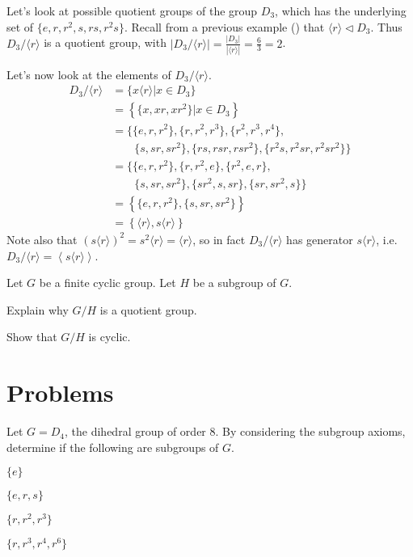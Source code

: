 \begin{example}
    Let's look at possible quotient groups of the group $D_3$, which has the underlying set of $\{e, r, r^2, s, rs, r^2s\}$. Recall from a previous example () that $\langle r \rangle \lhd D_3$. Thus $D_3 / \langle r \rangle$ is a quotient group, with $|D_3 / \langle r \rangle| = \frac{|D_3|}{|\langle r\rangle|} = \frac63 = 2$.

    Let's now look at the elements of $D_3 / \langle r \rangle$.
    \begin{align*}
        D_3 / \langle r \rangle  &= \{x\langle r \rangle \vert x \in D_3\}\\
        &= \left\{\{x, xr, xr^2\} \vert x \in D_3\right\}\\
        &= \{\{e, r, r^2\}, \{r, r^2, r^3\}, \{r^2, r^3, r^4\}, \\ &\quad\quad \{s, sr, sr^2\}, \{rs, rsr, rsr^2\}, \{r^2s, r^2sr, r^2sr^2\}\}\\
        &= \{\{e, r, r^2\}, \{r, r^2, e\}, \{r^2, e, r\}, \\ &\quad\quad \{s, sr, sr^2\}, \{sr^2, s, sr\}, \{sr, sr^2, s\}\}\\
        &= \left\{\{e, r, r^2\}, \{s, sr, sr^2\}\right\}\\
        &= \left\{\langle r\rangle, s\langle r \rangle\right\}
    \end{align*}
    Note also that $(s\langle r \rangle)^2 = s^2\langle r \rangle = \langle r\rangle$, so in fact $D_3 / \langle r \rangle$ has generator $s\langle r \rangle$, i.e. $D_3 / \langle r \rangle = \left\langle s\langle r \rangle \right\rangle$.
\end{example}

\begin{exercise}\label{exercise-quotient-group-of-cyclic-group-is-cyclic}
    Let $G$ be a finite cyclic group. Let $H$ be a subgroup of $G$.
    \begin{partquestions}{\roman*}
        \item Explain why $G/H$ is a quotient group.
        \item Show that $G/H$ is cyclic.
    \end{partquestions}    
\end{exercise}

\newpage

\section{Problems}
\begin{problem}
    Let $G = D_4$, the dihedral group of order 8. By considering the subgroup axioms, determine if the following are subgroups of $G$.
    \begin{partquestions}{\alph*}
        \item $\{e\}$
        \item $\{e, r, s\}$
        \item $\{r, r^2, r^3\}$
        \item $\{r, r^3, r^4, r^6\}$
    \end{partquestions}
\end{problem}

